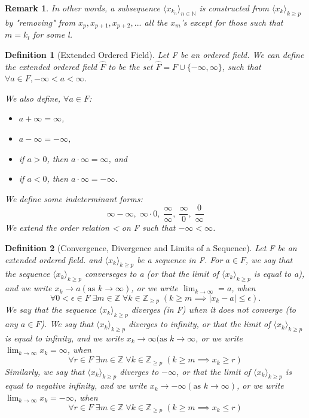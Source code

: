 \documentclass[11pt, oneside]{book}
\theoremstyle{break}
\newtheorem*{remark}{Remark}
\newtheorem{defn}{Definition}[section]
\newcommand{\bb}[1]{\mathbb{#1}}			%
\begin{document}
\begin{remark}
	In other words, a subsequence $\langle x_{k_n} \rangle_{n \in \bb{N}}$ is constructed from $\langle x_k \rangle_{k \geq p}$ by "removing" from $x_p, x_{p + 1}, x_{p + 2}, ...$ all the $x_m$'s except for those such that $m = k_l$ for some l.
\end{remark}

\begin{defn}[Extended Ordered Field]
	Let F be an ordered field. We can define the extended ordered field $\hat{F}$ to be the set $\hat{F} = F \cup \{-\infty, \infty\}$, such that $\forall a \in F, -\infty < a < \infty$.

	We also define, $\forall a \in F$:
	\begin{itemize}
		\item $a + \infty = \infty$,
		\item $a - \infty = -\infty$,
		\item if $a > 0$, then $a \cdot \infty = \infty$, and
		\item if $a < 0$, then $a \cdot \infty = -\infty$.
	\end{itemize}

	We define some indeterminant forms:
	\[
		\infty - \infty, \; \infty \cdot 0, \; \frac{\infty}{\infty}, \; \frac{\infty}{0}, \; \frac{0}{\infty}
	\]
	We extend the order relation < on F such that $-\infty < \infty$.
\end{defn}

\begin{defn}[Convergence, Divergence and Limits of a Sequence]
	Let F be an extended ordered field. and $\langle x_k \rangle_{k \geq p}$ be a sequence in F. For $a \in F$, we say that the sequence $\langle x_k \rangle_{k \geq p}$ converseges to a (or that the limit of $\langle x_k \rangle_{k \geq p}$ is equal to a), and we write $x_k \to a (\text{as } k \to \infty)$, or we write $\lim_{k \to \infty} = a$, when
	\[
		\forall 0 < \epsilon \in F \; \exists m \in \bb{Z} \; \forall k \in \bb{Z}_{\geq p} \; (k \geq m \implies |x_k - a| \leq \epsilon).
	\]
	We say that the sequence $\langle x_k \rangle_{k \geq p}$ diverges (in F) when it does not converge (to any $a \in F$). We say that $\langle x_k \rangle_{k \geq p}$ diverges to infinity, or that the limit of $\langle x_k \rangle_{k \geq p}$ is equal to infinity, and we write $x_k \to \infty (\text{as } k \to \infty$, or we write $\lim_{k \to \infty}x_k = \infty$, when
	\[
		\forall r \in F \; \exists m \in \bb{Z} \; \forall k \in \bb{Z}_{\geq p} \; (k \geq m \implies x_k \geq r)
	\]
	Similarly, we say that $\langle x_k \rangle_{k \geq p}$ diverges to $-\infty$, or that the limit of $\langle x_k \rangle_{k \geq p}$ is equal to negative infinity, and we write $x_k \to -\infty (\text{as } k \to \infty)$, or we write $\lim_{k \to \infty}x_k = -\infty$, when
	\[
		\forall r \in F \; \exists m \in \bb{Z} \; \forall k \in \bb{Z}_{\geq p} \; (k \geq m \implies x_k \leq r)
	\]
\end{defn}
\end{document}
